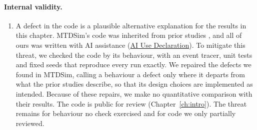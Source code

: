 \documentclass{cshonours}
\begin{document}
\paragraph{Internal validity.}
\begin{enumerate}[label=T\arabic*, ref=T\arabic*, series=threats, align=left]
\item\label{thr:code} A defect in the code is a plausible alternative
explanation for the results in this chapter. MTDSim's code was inherited from
prior studies \citep{brown2023,zhang2023,ho2024,tay2024}, and all of ours was
written with AI assistance (\hyperref[ch:ai-declaration]{AI Use Declaration}). To mitigate this threat, we checked the code by
its behaviour, with an event tracer, unit tests and fixed seeds that reproduce
every run exactly. We repaired the defects we found in MTDSim, calling a
behaviour a defect only where it departs from what the prior studies describe,
so that its design choices are implemented as intended. Because of these
repairs, we make no quantitative comparison with their results. The code is
public for review (Chapter~\ref{ch:intro}). The threat remains for behaviour
no check exercised and for code we only partially reviewed.


\end{enumerate}
\end{document}
